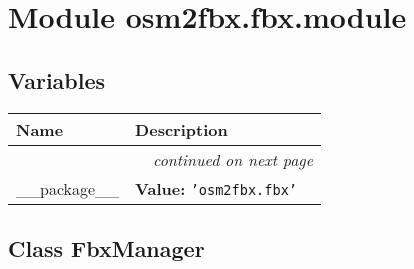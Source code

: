%
%
%


\section{Module osm2fbx.fbx.module}

    \label{osm2fbx:fbx:module}


  \subsection{Variables}

    \vspace{-1cm}
\hspace{\varindent}\begin{longtable}{|p{\varnamewidth}|p{\vardescrwidth}|l}
\cline{1-2}
\cline{1-2} \centering \textbf{Name} & \centering \textbf{Description}& \\
\cline{1-2}
\endhead\cline{1-2}\multicolumn{3}{r}{\small\textit{continued on next page}}\\\endfoot\cline{1-2}
\endlastfoot\raggedright \_\-\_\-p\-a\-c\-k\-a\-g\-e\-\_\-\_\- & \raggedright \textbf{Value:} 
{\tt \texttt{'}\texttt{osm2fbx.fbx}\texttt{'}}&\\
\cline{1-2}
\end{longtable}



\subsection{Class FbxManager}

